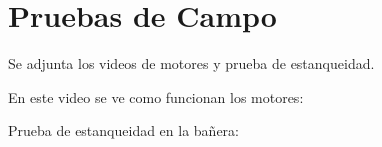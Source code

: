 \chapter{Pruebas de Campo}

Se adjunta los videos de motores y prueba de estanqueidad.

En este video se ve como funcionan los motores:


Prueba de estanqueidad en la bañera:

